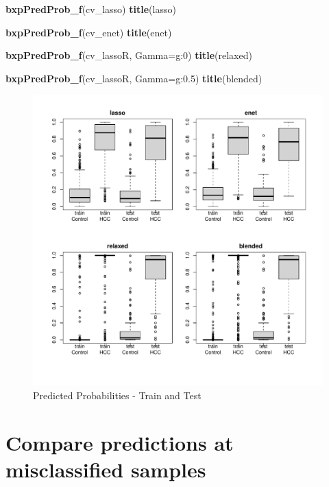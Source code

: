 \documentclass[
]{book}
\newenvironment{Shaded}{\begin{snugshade}}{\end{snugshade}}
\newcommand{\DataTypeTok}[1]{\textcolor[rgb]{0.13,0.29,0.53}{#1}}
\newcommand{\KeywordTok}[1]{\textcolor[rgb]{0.13,0.29,0.53}{\textbf{#1}}}
\newcommand{\NormalTok}[1]{#1}
\newcommand{\StringTok}[1]{\textcolor[rgb]{0.31,0.60,0.02}{#1}}
\begin{document}
\begin{Shaded}
\begin{Highlighting}[]
\KeywordTok{bxpPredProb\_f}\NormalTok{(cv\_lasso)}
\KeywordTok{title}\NormalTok{(}\StringTok{\textquotesingle{}lasso\textquotesingle{}}\NormalTok{)}

\KeywordTok{bxpPredProb\_f}\NormalTok{(cv\_enet)}
\KeywordTok{title}\NormalTok{(}\StringTok{\textquotesingle{}enet\textquotesingle{}}\NormalTok{)}

\KeywordTok{bxpPredProb\_f}\NormalTok{(cv\_lassoR, }\DataTypeTok{Gamma=}\StringTok{\textquotesingle{}g:0\textquotesingle{}}\NormalTok{)}
\KeywordTok{title}\NormalTok{(}\StringTok{\textquotesingle{}relaxed\textquotesingle{}}\NormalTok{)}

\KeywordTok{bxpPredProb\_f}\NormalTok{(cv\_lassoR, }\DataTypeTok{Gamma=}\StringTok{\textquotesingle{}g:0.5\textquotesingle{}}\NormalTok{)}
\KeywordTok{title}\NormalTok{(}\StringTok{\textquotesingle{}blended\textquotesingle{}}\NormalTok{)}
\end{Highlighting}
\end{Shaded}

\begin{figure}
\centering
\includegraphics{Static/figures/fitPrevalByGroup-1.pdf}
\caption{\label{fig:fitPrevalByGroup}Predicted Probabilities - Train and Test}
\end{figure}

\hypertarget{compare-predictions-at-misclassified-samples}{%
\section{Compare predictions at misclassified samples}\label{compare-predictions-at-misclassified-samples}}
\end{document}
